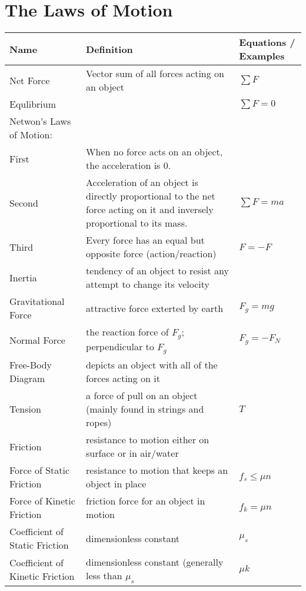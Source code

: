 \documentclass[11pt]{article}
\begin{document}
\section{The Laws of Motion}
\begin{tabularx}{\textwidth}{l| X l}
    Name & Definition & Equations / Examples \\ \hline
    Net Force & Vector sum of all forces acting on an object & $ \sum{F} $ \bigstrut \\ \hline
    Equlibrium & & $ \sum{F} = 0 $ \bigstrut \\ \hline
    Netwon's Laws of Motion: && \\* First & When no force acts on an object, the acceleration is 0. & \\* Second & Acceleration of an object is directly proportional to the net force acting on it and inversely proportional to its mass. & $ \sum{F} = ma $ \\* Third & Every force has an equal but opposite force (action/reaction) & $ F = -F $ \\ \hline
    Inertia & tendency of an object to resist any attempt to change its velocity & \\ \hline
    Gravitational Force & attractive force exterted by earth & $ F_{g} = mg $ \bigstrut \\ \hline
    Normal Force & the reaction force of $ F_{g} $; perpendicular to $ F_{g} $ & $ F_{g} = -F_{N} $ \bigstrut \\ \hline
    Free-Body Diagram & depicts an object with all of the forces acting on it & \\ \hline
    Tension & a force of pull on an object (mainly found in strings and ropes) & $ T $ \\ \hline
    Friction & resistance to motion either on surface or in air/water & \\ \hline
    Force of Static Friction & resistance to motion that keeps an object in place & $ f_{s} \le \mu n $  \\ \hline
    Force of Kinetic Friction & friction force for an object in motion & $ f_{k} = \mu n $ \\ \hline
    Coefficient of Static Friction & dimensionless constant & $ \mu_{s} $ \bigstrut \\ \hline
    Coefficient of Kinetic Friction & dimensionless constant (generally less than $ \mu_{s} $ & $ \mu{k} $ \bigstrut \\ \hline
\end{tabularx}
\end{document}

